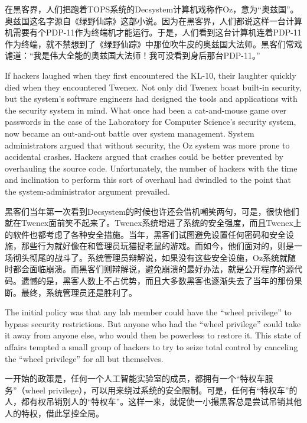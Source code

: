 \ifdefined\chs
在黑客界，人们把跑着TOPS系统的Decsystem计算机戏称作Oz，意为``奥兹国''。奥兹国这名字源自《绿野仙踪》这部小说。因为在黑客界，人们都说这样一台计算机需要有个PDP-11作为终端机才能运行。于是，人们看到这台计算机连着PDP-11作为终端，就不禁想到了《绿野仙踪》中那位吹牛皮的奥兹国大法师。黑客们常戏谑道：``我是伟大全能的奥兹国大法师！我可没看到身后那台PDP-11。''
\fi

\ifdefined\eng
If hackers laughed when they first encountered the KL-10, their laughter quickly died when they encountered Twenex. Not only did Twenex boast built-in security, but the system's software engineers had designed the tools and applications with the security system in mind. What once had been a cat-and-mouse game over passwords in the case of the Laboratory for Computer Science's security system, now became an out-and-out battle over system management. System administrators argued that without security, the Oz system was more prone to accidental crashes. Hackers argued that crashes could be better prevented by overhauling the source code. Unfortunately, the number of hackers with the time and inclination to perform this sort of overhaul had dwindled to the point that the system-administrator argument prevailed.
\fi

\ifdefined\chs
黑客们当年第一次看到Decsystem的时候也许还会借机嘲笑两句，可是，很快他们就在Twenex面前笑不起来了。Twenex系统增进了系统的安全强度，而且Twenex上的软件也都考虑了各种安全措施。当年，黑客们试图避免设置任何密码和安全设施，那些行为就好像在和管理员玩猫捉老鼠的游戏。而如今，他们面对的，则是一场彻头彻尾的战斗了。系统管理员辩解说，如果没有这些安全设施，Oz系统就随时都会面临崩溃。而黑客们则辩解说，避免崩溃的最好办法，就是公开程序的源代码。遗憾的是，黑客人数上不占优势，而且大多数黑客也逐渐失去了当年的那份果断。最终，系统管理员还是胜利了。
\fi

\ifdefined\vtwo
\ifdefined\eng
The initial policy was that any lab member could have the ``wheel privilege'' to bypass security restrictions.  But anyone who had the ``wheel privilege'' could take it away from anyone else, who would then be powerless to restore it.  This state of affairs tempted a small group of hackers to try to seize total control by canceling the ``wheel privilege'' for all but themselves.
\fi

\ifdefined\chs
一开始的政策是，任何一个人工智能实验室的成员，都拥有一个``特权车服务''（wheel privilege），可以用来绕过系统的安全限制。可是，任何有``特权车''的人，都有权吊销别人的``特权车''。这样一来，就促使一小撮黑客总是尝试吊销其他人的特权，借此掌控全局。
\fi
\fi

